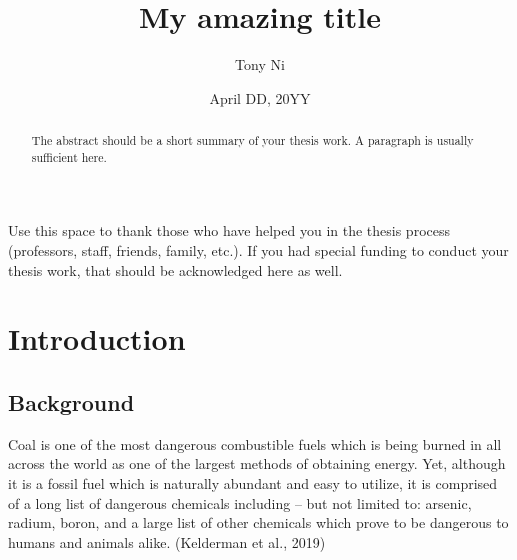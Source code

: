 \documentclass[12pt, twoside]{amherstthesis}
\title{My amazing title}
\author{Tony Ni}
\date{April DD, 20YY}
\begin{document}
\doublespace
  \maketitle

\frontmatter %
\pagestyle{fancyplain}

  \begin{abstract}
    The abstract should be a short summary of your thesis work. A paragraph is usually sufficient here.
  \end{abstract}
  \begin{acknowledgments}
    Use this space to thank those who have helped you in the thesis process (professors, staff, friends, family, etc.). If you had special funding to conduct your thesis work, that should be acknowledged here as well.
  \end{acknowledgments}

  \hypersetup{linkcolor=black}
  \setcounter{tocdepth}{2}
  \tableofcontents

  \listoftables

  \listoffigures


\mainmatter %
\pagestyle{fancyplain} %

\hypertarget{intro}{%
\chapter{Introduction}\label{intro}}

\hypertarget{background}{%
\section{Background}\label{background}}

Coal is one of the most dangerous combustible fuels which is being burned in all across the world as one of the largest methods of obtaining energy. Yet, although it is a fossil fuel which is naturally abundant and easy to utilize, it is comprised of a long list of dangerous chemicals including -- but not limited to: arsenic, radium, boron, and a large list of other chemicals which prove to be dangerous to humans and animals alike. (Kelderman et al., 2019)
\end{document}

